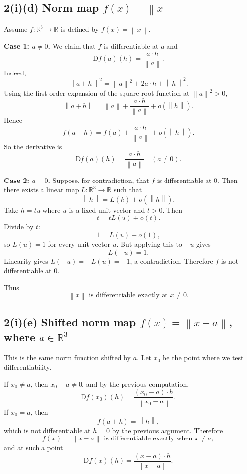 \documentclass[11pt]{article}
\newcommand{\R}{\mathbb{R}}
\newcommand{\norm}[1]{\left\lVert #1\right\rVert}
\newcommand{\D}{\mathrm{D}}
\begin{document}
\subsection*{2(i)(d) Norm map $f(x)=\norm{x}$}
Assume $f:\R^3\to\R$ is defined by $f(x)=\norm{x}$.

\textbf{Case 1: $a\neq 0$.} We claim that $f$ is differentiable at $a$ and
\[
 \D f(a)(h)=\frac{a\cdot h}{\norm{a}}.
\]
Indeed,
\[
 \norm{a+h}^2=\norm{a}^2+2a\cdot h+\norm{h}^2.
\]
Using the first-order expansion of the square-root function at $\norm a^2>0$,
\[
 \norm{a+h}
 =\norm a+\frac{a\cdot h}{\norm a}+o(\norm h).
\]
Hence
\[
 f(a+h)=f(a)+\frac{a\cdot h}{\norm a}+o(\norm h).
\]
So the derivative is
\[
 \boxed{\D f(a)(h)=\frac{a\cdot h}{\norm a}\quad(a\neq 0).}
\]

\textbf{Case 2: $a=0$.} Suppose, for contradiction, that $f$ is differentiable at $0$. Then there exists a linear map $L:\R^3\to\R$ such that
\[
 \norm{h}=L(h)+o(\norm h).
\]
Take $h=tu$ where $u$ is a fixed unit vector and $t>0$. Then
\[
 t=tL(u)+o(t).
\]
Divide by $t$:
\[
 1=L(u)+o(1),
\]
so $L(u)=1$ for every unit vector $u$. But applying this to $-u$ gives
\[
 L(-u)=1.
\]
Linearity gives $L(-u)=-L(u)=-1$, a contradiction. Therefore $f$ is not differentiable at $0$.

\begin{center}
\end{center}

Thus
\[
 \boxed{\norm{x}\text{ is differentiable exactly at }x\neq 0.}
\]

\subsection*{2(i)(e) Shifted norm map $f(x)=\norm{x-a}$, where $a\in\R^3$}
This is the same norm function shifted by $a$.  Let $x_0$ be the point where we test differentiability.

If $x_0\neq a$, then $x_0-a\neq 0$, and by the previous computation,
\[
 \D f(x_0)(h)=\frac{(x_0-a)\cdot h}{\norm{x_0-a}}.
\]
If $x_0=a$, then
\[
 f(a+h)=\norm{h},
\]
which is not differentiable at $h=0$ by the previous argument. Therefore
\[
 \boxed{f(x)=\norm{x-a}\text{ is differentiable exactly when }x\neq a,}
\]
and at such a point
\[
 \boxed{\D f(x)(h)=\frac{(x-a)\cdot h}{\norm{x-a}}.}
\]
\end{document}
